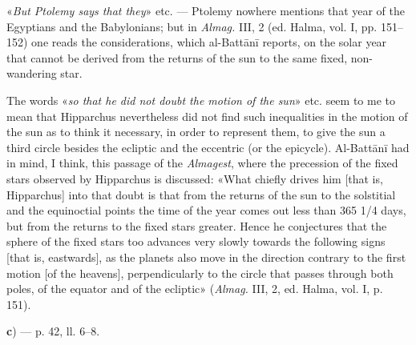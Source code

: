 \documentclass[11pt]{article}
\begin{document}
\par «\emph{But Ptolemy says that they}» etc. — Ptolemy nowhere mentions that year of the Egyptians and the Babylonians; but in \emph{Almag.} III, 2 (ed. Halma, vol. I, pp. 151–152) one reads the considerations, which al-Battānī reports, on the solar year that cannot be derived from the returns of the sun to the same fixed, non-wandering star.\par
\par The words «\emph{so that he did not doubt the motion of the sun}» etc. seem to me to mean that Hipparchus nevertheless did not find such inequalities in the motion of the sun as to think it necessary, in order to represent them, to give the sun a third circle besides the ecliptic and the eccentric (or the epicycle). Al-Battānī had in mind, I think, this passage of the \emph{Almagest}, where the precession of the fixed stars observed by Hipparchus is discussed: «What chiefly drives him [that is, Hipparchus] into that doubt is that from the returns of the sun to the solstitial and the equinoctial points the time of the year comes out less than 365 1/4 days, but from the returns to the fixed stars greater. Hence he conjectures that the sphere of the fixed stars too advances very slowly towards the following signs [that is, eastwards], as the planets also move in the direction contrary to the first motion [of the heavens], perpendicularly to the circle that passes through both poles, of the equator and of the ecliptic» (\emph{Almag.} III, 2, ed. Halma, vol. I, p. 151).\par
\par\begin{center}\textbf{c}) — p. 42, ll. 6–8.\end{center}
\end{document}
